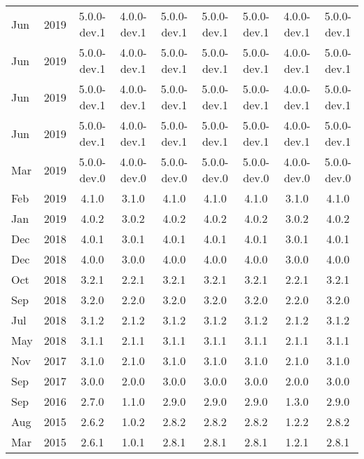 \begin{xtabular}{|ll|c|c|c|c|c|c|c|}
Jun & 2019 & 5.0.0-dev.1 & 4.0.0-dev.1 & 5.0.0-dev.1 & 5.0.0-dev.1 & 5.0.0-dev.1 & 4.0.0-dev.1 & 5.0.0-dev.1 \\
Jun & 2019 & 5.0.0-dev.1 & 4.0.0-dev.1 & 5.0.0-dev.1 & 5.0.0-dev.1 & 5.0.0-dev.1 & 4.0.0-dev.1 & 5.0.0-dev.1 \\
Jun & 2019 & 5.0.0-dev.1 & 4.0.0-dev.1 & 5.0.0-dev.1 & 5.0.0-dev.1 & 5.0.0-dev.1 & 4.0.0-dev.1 & 5.0.0-dev.1 \\
Jun & 2019 & 5.0.0-dev.1 & 4.0.0-dev.1 & 5.0.0-dev.1 & 5.0.0-dev.1 & 5.0.0-dev.1 & 4.0.0-dev.1 & 5.0.0-dev.1 \\
Mar & 2019 & 5.0.0-dev.0 & 4.0.0-dev.0 & 5.0.0-dev.0   & 5.0.0-dev.0 & 5.0.0-dev.0 & 4.0.0-dev.0 & 5.0.0-dev.0\\
Feb & 2019 & 4.1.0       & 3.1.0       & 4.1.0         & 4.1.0       & 4.1.0       & 3.1.0       & 4.1.0\\
Jan & 2019 & 4.0.2       & 3.0.2       & 4.0.2         & 4.0.2       & 4.0.2       & 3.0.2       & 4.0.2\\
Dec & 2018 & 4.0.1       & 3.0.1       & 4.0.1         & 4.0.1       & 4.0.1       & 3.0.1       & 4.0.1\\
Dec & 2018 & 4.0.0       & 3.0.0       & 4.0.0         & 4.0.0       & 4.0.0       & 3.0.0       & 4.0.0\\
Oct & 2018 & 3.2.1       & 2.2.1       & 3.2.1         & 3.2.1       & 3.2.1       & 2.2.1       & 3.2.1\\
Sep & 2018 & 3.2.0       & 2.2.0       & 3.2.0         & 3.2.0       & 3.2.0       & 2.2.0       & 3.2.0\\
Jul & 2018 & 3.1.2       & 2.1.2       & 3.1.2         & 3.1.2       & 3.1.2       & 2.1.2       & 3.1.2\\
May & 2018 & 3.1.1       & 2.1.1       & 3.1.1         & 3.1.1       & 3.1.1       & 2.1.1       & 3.1.1\\
Nov & 2017 & 3.1.0       & 2.1.0       & 3.1.0         & 3.1.0       & 3.1.0       & 2.1.0       & 3.1.0\\
Sep & 2017 & 3.0.0       & 2.0.0       & 3.0.0         & 3.0.0       & 3.0.0       & 2.0.0       & 3.0.0\\
Sep & 2016 & 2.7.0       & 1.1.0       & 2.9.0         & 2.9.0       & 2.9.0       & 1.3.0       & 2.9.0\\
Aug & 2015 & 2.6.2       & 1.0.2       & 2.8.2         & 2.8.2       & 2.8.2       & 1.2.2       & 2.8.2\\
Mar & 2015 & 2.6.1       & 1.0.1       & 2.8.1         & 2.8.1       & 2.8.1       & 1.2.1       & 2.8.1\\

\end{xtabular}
